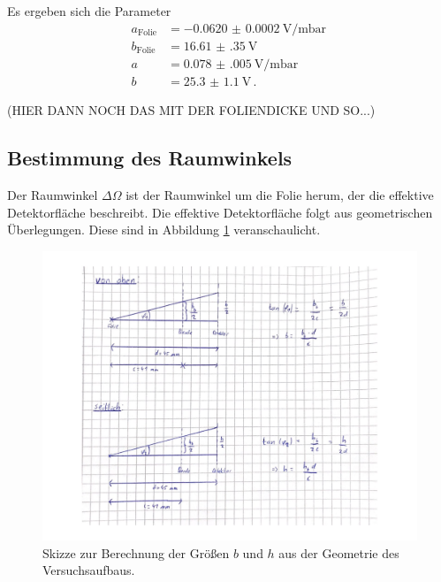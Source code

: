 Es ergeben sich die Parameter
\begin{align*}
  a_{\text{Folie}}&=\SI{-0.0620(002)}{\volt\per\milli\bar} \, \\
  b_{\text{Folie}}&=\SI{16.61(35)}{\volt} \,\\
  a&=\SI{0.078(005)}{\volt\per\milli\bar} \, \\
  b&=\SI{25.3(11)}{\volt} \,.
\end{align*}

(HIER DANN NOCH DAS MIT DER FOLIENDICKE UND SO...)

\subsection{Bestimmung des Raumwinkels}
\label{subsec:raumwinkel}

Der Raumwinkel $\Delta \Omega$ ist der Raumwinkel um die Folie herum, der die
effektive Detektorfläche beschreibt. Die effektive Detektorfläche folgt aus geometrischen
Überlegungen. Diese sind in Abbildung \ref{fig:skizze} veranschaulicht.

\begin{figure}
  \centering
  \includegraphics[width=\textwidth]{images/skizze.pdf}
  \caption{Skizze zur Berechnung der Größen $b$ und $h$ aus der Geometrie des Versuchsaufbaus.}
  \label{fig:skizze}
\end{figure}

